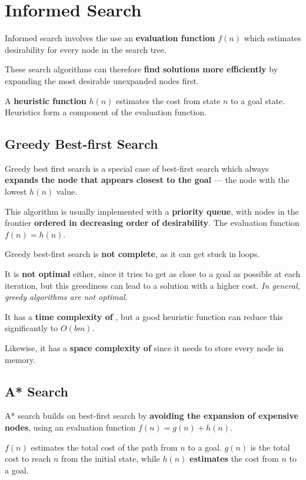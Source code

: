 \section{Informed Search}
    Informed search involves the use an \textbf{evaluation function} $f(n)$ which estimates desirability for every node in the search tree.

    These search algorithms can therefore \textbf{find solutions more efficiently} by expanding the most desirable unexpanded nodes first.

    A \textbf{heuristic function} $h(n)$ estimates the cost from state $n$ to a goal state. Heuristics form a component of the evaluation function.

    \subsection{Greedy Best-first Search}
        Greedy best first search is a special case of best-first search which always \textbf{expands the node that appears closest to the goal} --- the node with the lowest $h(n)$ value.

        This algorithm is usually implemented with a \textbf{priority queue}, with nodes in the frontier \textbf{ordered in decreasing order of desirability}. The evaluation function $f(n) = h(n)$.

        Greedy best-first search is \textbf{not complete}, as it can get stuck in loops.

        It is \textbf{not optimal} either, since it tries to get as close to a goal as possible at each iteration, but this greediness can lead to a solution with a higher cost. \emph{In general, greedy algorithms are not optimal.}

        It has a \textbf{time complexity of} , but a good heuristic function can reduce this significantly to $O(bm)$.

        Likewise, it has a \textbf{space complexity of}  since it needs to store every node in memory.

    \subsection{A* Search}
        A* search builds on best-first search by \textbf{avoiding the expansion of expensive nodes}, using an evaluation function $f(n) = g(n) + h(n)$.

        $f(n)$ estimates the total cost of the path from $n$ to a goal. $g(n)$ is the total cost to reach $n$ from the initial state, while $h(n)$ \textbf{estimates} the cost from $n$ to a goal.

